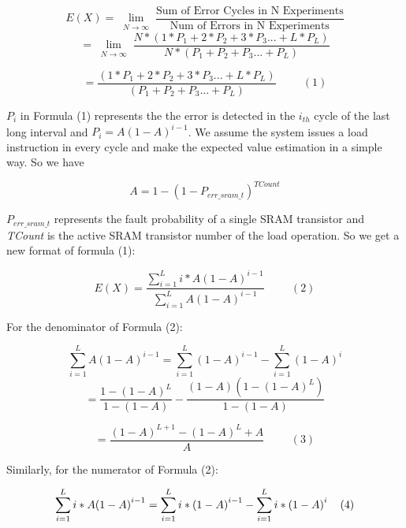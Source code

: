 \documentclass{sig-alternate}
\begin{document}
  \scriptsize 
  \begin{spacing}{0.8}
  \textit{\[E(X) =\lim_{\substack{N\to \infty}}\frac{\text{Sum of  Error  Cycles  in  N  Experiments}}{\text{Num  of  Errors  in  N  Experiments}}\]}
\[=\lim_{\substack{N\to \infty}}\frac{N*(1*P_{1}+2*P_{2}+3*P_{3}...+L*P_{L})}{N*(P_{1}+P_{2}+P_{3}...+P_{L})}\]
  \end{spacing}
  \[=\frac{(1*P_{1}+2*P_{2}+3*P_{3}...+L*P_{L})}{(P_{1}+P_{2}+P_{3}...+P_{L})} \hspace{1cm}(1)\] 
 \normalsize
  \begin{spacing}{1}
\textbf{ $P_{i}$} in Formula (1) represents the the error is detected in the \textbf{ $i_{th}$}  cycle of the last long interval and  \textbf{ $P_{i} =  {A(1-A)}^{i-1}$}. We assume the system issues a load instruction in every cycle and make the expected value estimation in a simple way. So we have
\end{spacing} 
\scriptsize 
 \begin{spacing}{0.8}
 \[A= 1-{(1-{P}_{err\_sram\_t})}^{TCount}\] 
 \end{spacing} 
  \normalsize
  \begin{spacing}{1}
 \textit{ ${P}_{err\_sram\_t}$} represents the fault probability of a single SRAM transistor and  \textit{TCount} is the active SRAM transistor number of the load operation. So we get a new format of formula (1):
\end{spacing}
  \scriptsize 
   \begin{spacing}{0.8}
  \[E(X)=\frac{\sum_{i=1}^{L} i*A{(1-A)}^{i-1}}{\sum_{i=1}^{L} A{(1-A)}^{i-1}} \hspace{1cm}(2)\] 
  \end{spacing} 
 \normalsize
For the denominator of Formula (2):
 \scriptsize
  \begin{spacing}{0.6}
   \[\sum_{i=1}^{L} A{(1-A)}^{i-1} = \sum_{i=1}^{L} {(1-A)}^{i-1} - \sum_{i=1}^{L} {(1-A)}^{i}\] 
   \[=  \frac{1-(1-A)^{L}}{1-(1-A)} - \frac{(1-A)(1-(1-A)^L)}{1-(1-A)}\] 
  \end{spacing}
\[=  \frac{(1-A)^{L+1} - (1-A)^{L} +A}{A} \hspace{1cm}(3)\] 
  \normalsize
   \begin{spacing}{0.8}
  Similarly, for the numerator of Formula (2):
  \end{spacing}
  \scriptsize
\[\sum_{i=1}^{L} i*A{(1-A)}^{i-1} = \sum_{i=1}^{L} {i*(1-A)}^{i-1} - \sum_{i=1}^{L} {i*(1-A)}^{i}  \hspace{0.4cm}(4)\] 
\end{document}
